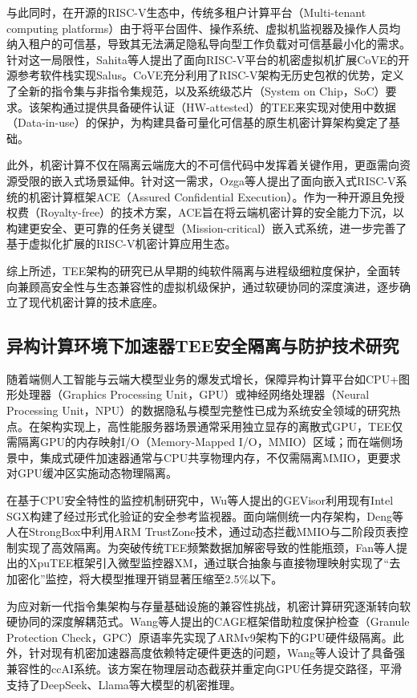 \documentclass[master, vlined, review]{DissertUESTC}
\begin{document}
	与此同时，在开源的RISC-V生态中，传统多租户计算平台（Multi-tenant computing platforms）由于将平台固件、操作系统、虚拟机监视器及操作人员均纳入租户的可信基，导致其无法满足隐私导向型工作负载对可信基最小化的需求。针对这一局限性，Sahita等人提出了面向RISC-V平台的机密虚拟机扩展CoVE的开源参考软件栈实现Salus。CoVE充分利用了RISC-V架构无历史包袱的优势，定义了全新的指令集与非指令集规范，以及系统级芯片（System on Chip，SoC）要求。该架构通过提供具备硬件认证（HW-attested）的TEE来实现对使用中数据（Data-in-use）的保护，为构建具备可量化可信基的原生机密计算架构奠定了基础。
	
	此外，机密计算不仅在隔离云端庞大的不可信代码中发挥着关键作用，更亟需向资源受限的嵌入式场景延伸。针对这一需求，Ozga等人提出了面向嵌入式RISC-V系统的机密计算框架ACE（Assured Confidential Execution）。作为一种开源且免授权费（Royalty-free）的技术方案，ACE旨在将云端机密计算的安全能力下沉，以构建更安全、更可靠的任务关键型（Mission-critical）嵌入式系统，进一步完善了基于虚拟化扩展的RISC-V机密计算应用生态。
	
	综上所述，TEE架构的研究已从早期的纯软件隔离与进程级细粒度保护，全面转向兼顾高安全性与生态兼容性的虚拟机级保护，通过软硬协同的深度演进，逐步确立了现代机密计算的技术底座。
	
	\subsection{异构计算环境下加速器TEE安全隔离与防护技术研究}
	
	随着端侧人工智能与云端大模型业务的爆发式增长，保障异构计算平台如CPU+图形处理器（Graphics Processing Unit，GPU）或神经网络处理器（Neural Processing Unit，NPU）的数据隐私与模型完整性已成为系统安全领域的研究热点。在架构实现上，高性能服务器场景通常采用独立显存的离散式GPU，TEE仅需隔离GPU的内存映射I/O（Memory-Mapped I/O，MMIO）区域；而在端侧场景中，集成式硬件加速器通常与CPU共享物理内存，不仅需隔离MMIO，更要求对GPU缓冲区实施动态物理隔离。
	
	在基于CPU安全特性的监控机制研究中，Wu等人提出的GEVisor利用现有Intel SGX构建了经过形式化验证的安全参考监视器。面向端侧统一内存架构，Deng等人在StrongBox中利用ARM TrustZone技术，通过动态拦截MMIO与二阶段页表控制实现了高效隔离。为突破传统TEE频繁数据加解密导致的性能瓶颈，Fan等人提出的XpuTEE框架引入微型监控器XM，通过联合抽象与直接物理映射实现了“去加密化”监控，将大模型推理开销显著压缩至2.5\%以下。
	
	为应对新一代指令集架构与存量基础设施的兼容性挑战，机密计算研究逐渐转向软硬协同的深度解耦范式。Wang等人提出的CAGE框架借助粒度保护检查（Granule Protection Check，GPC）原语率先实现了ARMv9架构下的GPU硬件级隔离。此外，针对现有机密加速器高度依赖特定硬件更迭的问题，Wang等人设计了具备强兼容性的ccAI系统。该方案在物理层动态截获并重定向GPU任务提交路径，平滑支持了DeepSeek、Llama等大模型的机密推理。
	
\end{document}
